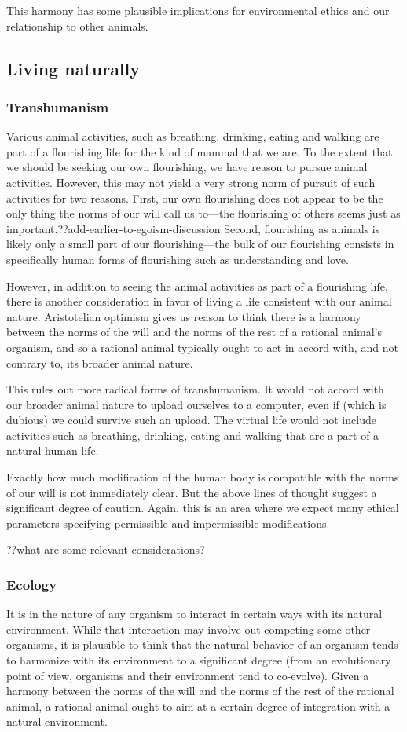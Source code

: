 This harmony has some plausible implications for environmental ethics and our relationship to other animals. 

\subsection{Living naturally}
\subsubsection{Transhumanism}
Various animal activities, such as breathing, drinking, eating and walking are part of a flourishing life for the kind of mammal 
that we are. To the extent that we should be seeking our own flourishing, we have reason to pursue animal activities. However,
this may not yield a very strong norm of pursuit of such activities for two reasons. First, our own flourishing does not appear
to be the only thing the norms of our will call us to---the flourishing of others seems just as important.??add-earlier-to-egoism-discussion
Second, flourishing as animals is likely only a small part of our flourishing---the bulk of our flourishing consists in specifically
human forms of flourishing such as understanding and love. 

However, in addition to seeing the animal activities as part of a flourishing life, there is another consideration in favor of 
living a life consistent with our animal nature. Aristotelian optimism gives us reason to think there is a harmony between 
the norms of the will and the norms of the rest of a rational animal's organism, and so a rational animal typically ought to act in 
accord with, and not contrary to, its broader animal nature. 

This rules out more radical forms of transhumanism. It would not accord with our broader animal nature to upload ourselves to a computer,
even if (which is dubious) we could survive such an upload. The virtual life would not include 
activities such as breathing, drinking, eating and walking that are a part of a natural human life.

Exactly how much modification of the human body is compatible with the norms of our will is not immediately clear. But the above
lines of thought suggest a significant degree of caution. Again, this is an area where we expect many ethical parameters specifying
permissible and impermissible modifications.

??what are some relevant considerations?

\subsubsection{Ecology}
It is in the nature of any organism to interact in certain ways with its natural environment. While that interaction may 
involve out-competing some other organisms, it is plausible to think that the natural behavior of an organism tends to 
harmonize with its environment to a significant degree (from an evolutionary point of view, organisms and their environment tend 
to co-evolve). Given a harmony between the norms of the will and the norms of the rest of the rational animal, a rational animal
ought to aim at a certain degree of integration with a natural environment.


